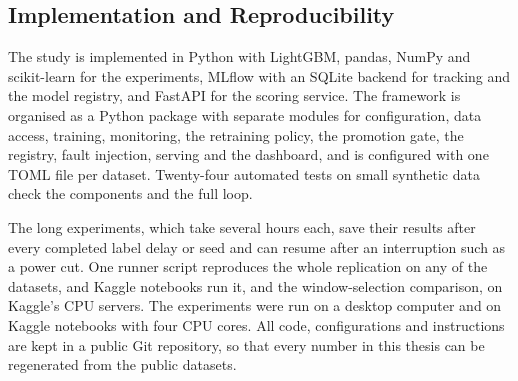 \subsection{Implementation and Reproducibility}\label{sec:impl}

The study is implemented in Python with LightGBM, pandas, NumPy and scikit-learn for the experiments, MLflow with an SQLite backend for tracking and the model registry, and FastAPI for the scoring service. The framework is organised as a Python package with separate modules for configuration, data access, training, monitoring, the retraining policy, the promotion gate, the registry, fault injection, serving and the dashboard, and is configured with one TOML file per dataset. Twenty-four automated tests on small synthetic data check the components and the full loop.

The long experiments, which take several hours each, save their results after every completed label delay or seed and can resume after an interruption such as a power cut. One runner script reproduces the whole replication on any of the datasets, and Kaggle notebooks run it, and the window-selection comparison, on Kaggle's CPU servers. The experiments were run on a desktop computer and on Kaggle notebooks with four CPU cores. All code, configurations and instructions are kept in a public Git repository, so that every number in this thesis can be regenerated from the public datasets.
